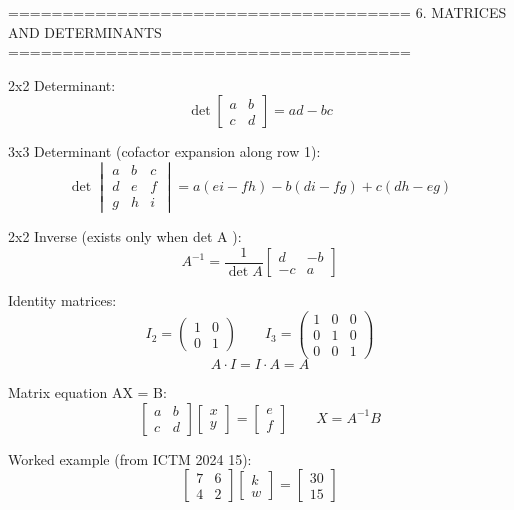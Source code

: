 =====================================
6. MATRICES AND DETERMINANTS
=====================================

2x2 Determinant:
$$\det \begin{bmatrix} a & b \\ c & d \end{bmatrix} = ad - bc$$

3x3 Determinant (cofactor expansion along row 1):
$$\det \begin{vmatrix} a & b & c \\ d & e & f \\ g & h & i \end{vmatrix} = a(ei - fh) - b(di - fg) + c(dh - eg)$$

2x2 Inverse (exists only when det A ):
$$A^{-1} = \frac{1}{\det A} \begin{bmatrix} d & -b \\ -c & a \end{bmatrix}$$

Identity matrices:
$$I_2 = \begin{pmatrix} 1 & 0 \\ 0 & 1 \end{pmatrix} \qquad I_3 = \begin{pmatrix} 1 & 0 & 0 \\ 0 & 1 & 0 \\ 0 & 0 & 1 \end{pmatrix}$$
$$A \cdot I = I \cdot A = A$$

Matrix equation AX = B:
$$\begin{bmatrix} a & b \\ c & d \end{bmatrix} \begin{bmatrix} x \\ y \end{bmatrix} = \begin{bmatrix} e \\ f \end{bmatrix} \qquad X = A^{-1} B$$

Worked example (from ICTM 2024 15):
$$\begin{bmatrix} 7 & 6 \\ 4 & 2 \end{bmatrix} \begin{bmatrix} k \\ w \end{bmatrix} = \begin{bmatrix} 30 \\ 15 \end{bmatrix}$$

